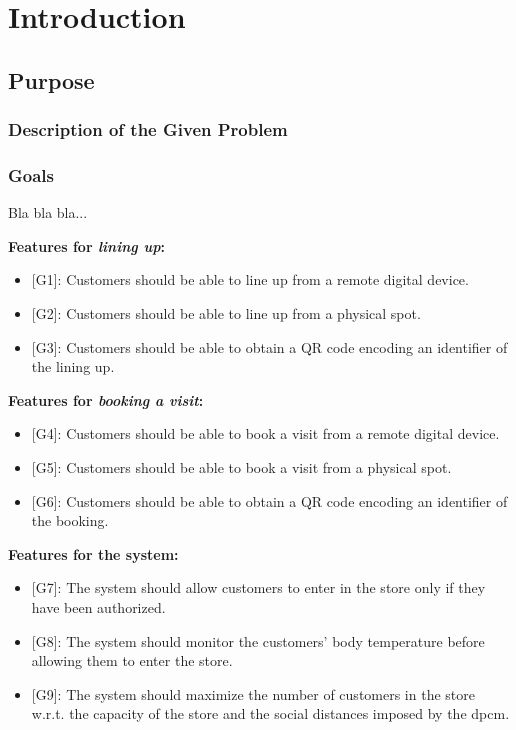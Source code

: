 \chapter{Introduction}

\section{Purpose}

\subsection{Description of the Given Problem}

\subsection{Goals}

Bla bla bla...

\textbf{Features for \textit{lining up}:}
\begin{itemize}
	\item {[G1]}: Customers should be able to line up from a remote digital device.
	\item {[G2]}: Customers should be able to line up from a physical spot.
	\item {[G3]}: Customers should be able to obtain a QR code encoding an identifier of the lining up.
\end{itemize}

\textbf{Features for \textit{booking a visit}:}
\begin{itemize}
	\item {[G4]}: Customers should be able to book a visit from a remote digital device.
	\item {[G5]}: Customers should be able to book a visit from a physical spot.
	\item {[G6]}: Customers should be able to obtain a QR code encoding an identifier of the booking.
\end{itemize}

\textbf{Features for the system:}
\begin{itemize}

	
	\item {[G7]}: The system should allow customers to enter in the store only if they have been authorized.
	\item {[G8]}: The system should monitor the customers' body temperature before allowing them to enter the store.
	\item {[G9]}: The system should maximize the number of customers in the store w.r.t. the capacity of the store and the social distances imposed by the \gls{dpcm}.
	
\end{itemize}

